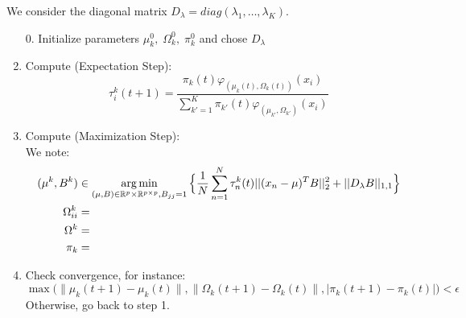 We consider the diagonal matrix $D_{\lambda}=diag(\lambda_1,\dots,\lambda_K)$.

\begin{enumerate}
\item[0.] Initialize parameters $\mu_k^0,\; \Omega_k^0,\;\pi_k^0$ and chose $D_{\lambda}$
\item Compute (Expectation Step):
\begin{equation}
\tau_i^k(t+1)=\frac{\pi_k(t) \varphi_{(\mu_k(t),\Omega_k(t))}(x_i)}{\sum_{k'=1}^K\pi_{k'}(t)\varphi_{(\mu_{k'},\Omega_{k'})}(x_i)}
\end{equation}
\item Compute (Maximization Step):\\
We note:
\begin{align}
(\mu^k,B^k)&\in \operatorname*{arg\,min}_{(\mu,B)\in {\mathbb R}^p \times {\mathbb R}^{p\times p},B_{jj}=1}\Big\{\frac{1}{N}\sum_{n=1}^N\tau_n^k(t)||(x_n-\mu)^TB||^2_2+||D_{\lambda}B||_{1,1}\Big\}\\
\Omega^k_{ii}&=\\
\Omega^k&=\\
\pi_k&=
\end{align}
\item Check convergence, for instance:\\
$\max\Big(\|\mu_k(t+1)-\mu_k(t)\|,\|\Omega_k(t+1)-\Omega_k(t)\|,|\pi_k(t+1)-\pi_k(t)|\Big)<\epsilon$
Otherwise, go back to step 1.
\end{enumerate}
